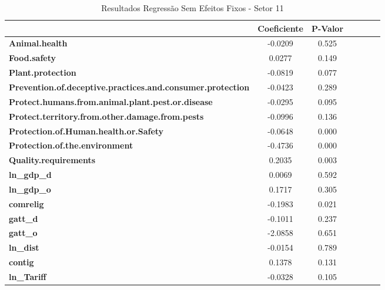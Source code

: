 \begin{table}[ht]
    
    \begin{center}
        \begin{tabular}{lcccccc}
            & \textbf{Coeficiente} & \textbf{P-Valor}\\
            \midrule
\textbf{Animal.health}                                             &      -0.0209 &         0.525 \\
\textbf{Food.safety}                                               &       0.0277 &         0.149 \\
\textbf{Plant.protection}                                          &      -0.0819 &         0.077 \\
\textbf{Prevention.of.deceptive.practices.and.consumer.protection} &      -0.0423 &         0.289 \\
\textbf{Protect.humans.from.animal.plant.pest.or.disease}          &      -0.0295 &         0.095 \\
\textbf{Protect.territory.from.other.damage.from.pests}            &      -0.0996 &         0.136 \\
\textbf{Protection.of.Human.health.or.Safety}                      &      -0.0648 &         0.000 \\
\textbf{Protection.of.the.environment}                             &      -0.4736 &         0.000 \\
\textbf{Quality.requirements}                                      &       0.2035 &         0.003 \\
\textbf{ln\_gdp\_d}                                                &       0.0069 &         0.592 \\
\textbf{ln\_gdp\_o}                                                &       0.1717 &         0.305 \\
\textbf{comrelig}                                                  &      -0.1983 &         0.021 \\
\textbf{gatt\_d}                                                   &      -0.1011 &         0.237 \\
\textbf{gatt\_o}                                                   &      -2.0858 &         0.651 \\
\textbf{ln\_dist}                                                  &      -0.0154 &         0.789 \\
\textbf{contig}                                                    &       0.1378 &         0.131 \\
\textbf{ln\_Tariff}                                                &      -0.0328 &         0.105 \\
\bottomrule
\end{tabular}
\caption{Resultados Regressão Sem Efeitos Fixos - Setor 11}
\end{center}
\end{table}